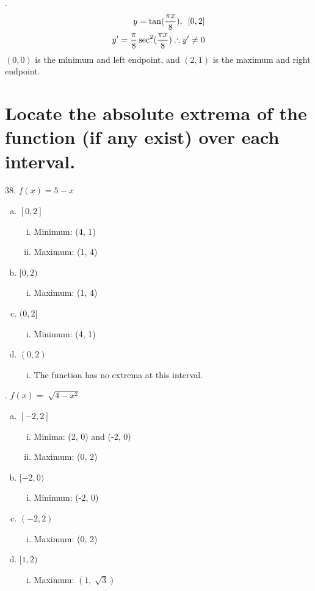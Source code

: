 \documentclass[11pt]{article}
\begin{document}
\vspace{1cm}
.\begin{eqnarray}
    \setcounter{equation}{1}
    y=\tan(\frac{\pi x}{8}),\,\,\,[0, 2]\\
    y'=\frac{\pi}{8}\sec^2(\frac{\pi x}{8})\therefore y'\neq0
\end{eqnarray}
$(0, 0)$ is the minimum and left endpoint, and $(2, 1)$ is the maximum and right endpoint.

\section{Locate the absolute extrema of the function (if any exist) over each interval.}
38. $f(x)=5-x$
\begin{enumerate}[(a)]
    \item $[0, 2]$
    \begin{enumerate}[i.]
        \item Minimum: (4, 1)
        \item Maximum: (1, 4)
    \end{enumerate}
    \item $[0, 2)$
    \begin{enumerate}[i.]
        \item Maximum: (1, 4)
    \end{enumerate}
    \item $(0, 2]$
    \begin{enumerate}[i.]
        \item Minimum: (4, 1)
    \end{enumerate}
    \item $(0, 2)$
    \begin{enumerate}[i.]
        \item The function has no extrema at this interval.
    \end{enumerate}
\end{enumerate}

\vspace{1cm}
. $f(x)=\sqrt[]{4-x^2}$
\begin{enumerate}[(a)]
    \item $[-2, 2]$
    \begin{enumerate}[i.]
        \item Minima: (2, 0) and (-2, 0)
        \item Maximum: (0, 2)
    \end{enumerate}
    \item $[-2, 0)$
    \begin{enumerate}[i.]
        \item Minimum: (-2, 0)
    \end{enumerate}
    \item $(-2, 2)$
    \begin{enumerate}[i.]
        \item Maximum: (0, 2)
    \end{enumerate}
    \item $[1, 2)$
    \begin{enumerate}[i.]
        \item Maximum: $(1, \sqrt[]{3})$
    \end{enumerate}
\end{enumerate}
\end{document}
